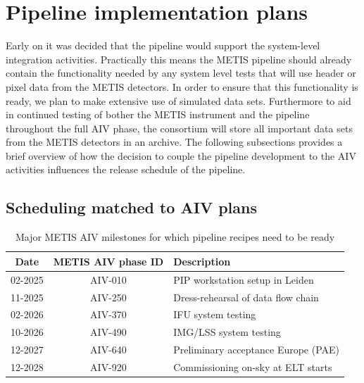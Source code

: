 \documentclass[a4paper]{spie}  %
\begin{document}
\section{Pipeline implementation plans}
\label{sec:imp}

Early on it was decided that the pipeline would support the system-level integration activities.
Practically this means the METIS pipeline should already contain the functionality needed by any system level tests that will use header or pixel data from the METIS detectors.
In order to ensure that this functionality is ready, we plan to make extensive use of simulated data sets. 
Furthermore to aid in continued testing of bother the METIS instrument and the pipeline throughout the full AIV phase, the consortium will store all important data sets from the METIS detectors in an archive.
The following subsections provides a brief overview of how the decision to couple the pipeline development to the AIV activities influences the release schedule of the pipeline.

\subsection{Scheduling matched to AIV plans}
\label{subsec:imp_aiv}

\begin{table}[]
    \centering
\caption{Major METIS AIV milestones for which pipeline recipes need to be ready}
\label{tab:dev_aiv_milestones}
    \begin{tabular}{c|c|l}
    \hline
    \hline
         Date &   METIS AIV phase ID & Description\\
         \hline
         02-2025 &   AIV-010&PIP workstation setup in Leiden\\
         11-2025 &   AIV-250&Dress-rehearsal of data flow chain\\
 02-2026 & AIV-370&IFU system testing\\
 10-2026 &  AIV-490&IMG/LSS system testing\\
 12-2027 & AIV-640&Preliminary acceptance Europe (PAE)\\
 12-2028 & AIV-920&Commissioning on-sky at ELT starts\\
 \hline
 \end{tabular}
      
\end{table}
\end{document}
